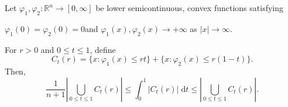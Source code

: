 \documentclass[10pt,a4paper]{amsart}
\newcommand{\R}{{\mathbb R}}
\begin{document}
\begin{lemma} \label{lem:KM-lp}
    Let $\varphi_1,\varphi_2 : \R^n \to [0,\infty]$  be lower semicontinuous, convex functions satisfying
    \begin{center}
        $\varphi_1(0) = \varphi_2(0) = 0$\quad and \quad$\varphi_1(x), \varphi_2 (x) \to + \infty$ as $|x| \to \infty$.
    \end{center}
    For $r >0$ and $0 \leq t\leq 1$, define
    \[
        C_t(r) = \{x: \varphi_1(x) \leq rt\} + \{x: \varphi_2(x) \leq r(1-t)\}.
    \]
    Then,
    \[
        \frac{1}{n+1} \left|\bigcup_{0 \leq t \leq 1} C_t(r) \right|
        \leq
        \int_0^1\left|C_t(r)\right| \;\mathrm d t
        \leq
        \left|\bigcup_{0 \leq t \leq 1} C_t(r)\right|.
    \]
\end{lemma}
\end{document}
